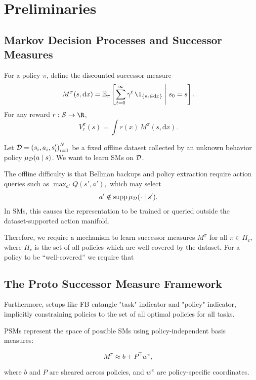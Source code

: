 \section{Preliminaries}


\subsection{Markov Decision Processes and Successor Measures}

For a policy \(\pi\), define the discounted successor measure
\[
M^\pi(s,\mathrm{d}x) = \E_\pi \left[ \sum_{t=0}^\infty \gamma^t \, \1_{\{s_t\in \mathrm{d}x\}} \;\middle|\; s_0=s \right].
\]
For any reward \(r:\Sspace\to\R\),
\[ V_r^\pi(s) = \int r(x)\, M^\pi(s,\mathrm{d}x). \]

Let \( \mathcal{D}={(s_i,a_i,s_i')}_{i=1}^N \) be a fixed offline dataset collected by an unknown behavior policy \(\mu_{\mathcal{D}}(a\mid s)\).  
We want to learn SMs on \(\mathcal{D}\).

The offline difficulty is that Bellman backups and policy extraction require action queries such as \( \max_{a'} Q(s',a'), \) which may select
\[
a' \notin \operatorname{supp} \mu_{\mathcal{D}}(\cdot\mid s').
\]
In SMs, this causes the representation to be trained or queried outside the dataset-supported action manifold.

Therefore, we require a mechanism to learn successor measures $M^\pi$ for all $\pi \in \Pi_c$, where $\Pi_c$ is the set of all policies which are well covered by the dataset.
For a policy to be ``well-covered'' we require that 


\subsection{The Proto Successor Measure Framework}

Furthermore, setups like FB entangle "task" indicator and "policy" indicator, implicitly constraining policies to the set of all optimal policies for all tasks.

PSMs represent the space of possible SMs using policy-independent basis measures:

\[
    M^\pi \approx b + P^\top w^\pi ,
\]


where $b$ and $P$ are sheared across policies, and \(w^\pi\) are policy-specific coordinates.

